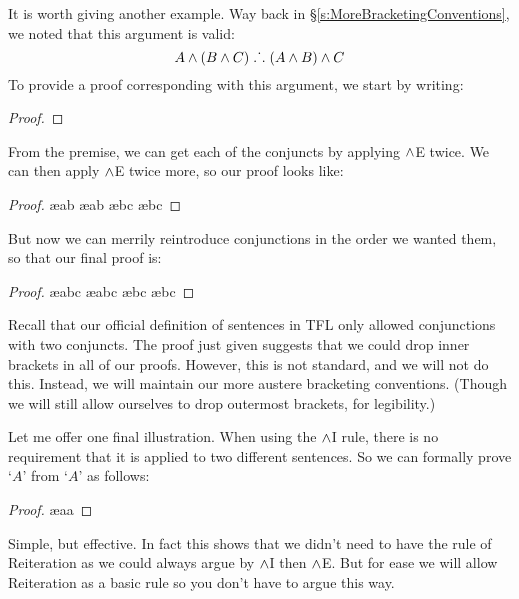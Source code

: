 It is worth giving another example. Way back in \S\ref{s:MoreBracketingConventions}, we noted that this argument is valid:
	$$A \wedge (B \wedge C) \mathrel{\ldotp\dot{}\,\ldotp} (A \wedge B) \wedge C$$
To provide a proof corresponding with this argument, we start by writing:
\begin{proof}
\end{proof}
From the premise, we can get each of the conjuncts by applying $\wedge$E twice. We can then apply $\wedge$E twice more, so our proof looks like:
\begin{proof}
	 \ae{ab}
	 \ae{ab}
	 \ae{bc}
	 \ae{bc}
\end{proof}
But now we can merrily reintroduce conjunctions in the order we wanted them, so that our final proof is:
\begin{proof}
	 \ae{abc}
	 \ae{abc}
	 \ae{bc}
	 \ae{bc}
\end{proof}
Recall that our official definition of sentences in TFL only allowed conjunctions with two conjuncts. The proof just given suggests that we could drop inner brackets in all of our proofs. However, this is not standard, and we will not do this. Instead, we will maintain our more austere bracketing conventions. (Though we will still allow ourselves to drop outermost brackets, for legibility.)

Let me offer one final illustration. When using the $\wedge$I rule, there is no requirement that it is applied to two different sentences. So we can formally prove `$A$' from `$A$' as follows:
\begin{proof}
	\ae{aa}
\end{proof}
Simple, but effective. In fact this shows that we didn't need to have the rule of Reiteration as we could always argue by $\wedge$I then $\wedge$E. But for ease we will allow Reiteration as a basic rule so you don't have to argue this way. 

